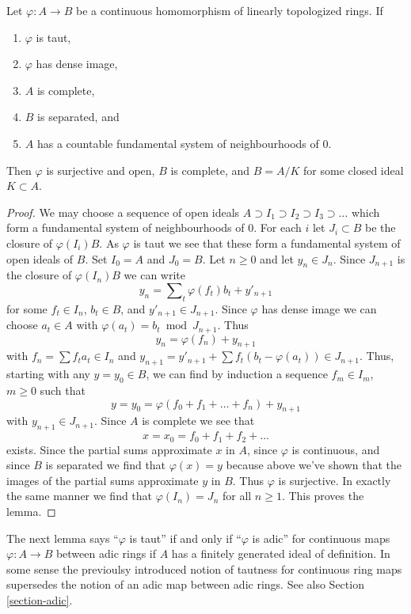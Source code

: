 \begin{lemma}
\label{lemma-dense-image-surjective}
Let $\varphi : A \to B$ be a continuous homomorphism of
linearly topologized rings. If
\begin{enumerate}
\item $\varphi$ is taut,
\item $\varphi$ has dense image,
\item $A$ is complete,
\item $B$ is separated, and
\item $A$ has a countable fundamental system of neighbourhoods of $0$.
\end{enumerate}
Then $\varphi$ is surjective and open, $B$ is complete, and $B = A/K$ for
some closed ideal $K \subset A$.
\end{lemma}

\begin{proof}
We may choose a sequence of open ideals
$A \supset I_1 \supset I_2 \supset I_3 \supset \ldots$
which form a fundamental system of neighbourhoods of $0$.
For each $i$ let $J_i \subset B$ be the closure of $\varphi(I_i)B$.
As $\varphi$ is taut we see that these form a fundamental system
of open ideals of $B$. Set $I_0 = A$ and $J_0 = B$.
Let $n \geq 0$ and let $y_n \in J_n$. Since $J_{n + 1}$ is the
closure of $\varphi(I_n)B$ we can write
$$
y_n = \sum\nolimits_t \varphi(f_t)b_t + y'_{n + 1}
$$
for some $f_t \in I_n$, $b_t \in B$, and $y'_{n + 1} \in J_{n + 1}$.
Since $\varphi$ has dense image we can choose $a_t \in A$ with
$\varphi(a_t) = b_t \bmod J_{n + 1}$. Thus
$$
y_n = \varphi(f_n) + y_{n + 1}
$$
with $f_n = \sum f_ta_t \in I_n$ and
$y_{n + 1} = y'_{n + 1} + \sum f_t(b_t - \varphi(a_t)) \in J_{n + 1}$.
Thus, starting with any $y = y_0 \in B$, we can find by induction
a sequence $f_m \in I_m$, $m \geq 0$ such that 
$$
y = y_0 = \varphi(f_0 + f_1 + \ldots + f_n) + y_{n + 1}
$$
with $y_{n + 1} \in J_{n + 1}$. Since $A$ is complete we see that
$$
x = x_0 = f_0 + f_1 + f_2 + \ldots
$$
exists. Since the partial sums approximate $x$ in $A$, since $\varphi$
is continuous, and since $B$ is separated we find that $\varphi(x) = y$
because above we've shown that the images of the partial sums approximate $y$
in $B$. Thus $\varphi$ is surjective. In exactly the same manner we
find that $\varphi(I_n) = J_n$ for all $n \geq 1$. This proves the lemma.
\end{proof}

\noindent
The next lemma says ``$\varphi$ is taut'' if and only if ``$\varphi$ is adic''
for continuous maps $\varphi : A \to B$ between adic rings if $A$
has a finitely generated ideal of definition. In some sense the previoulsy
introduced notion of tautness for continuous ring maps supersedes the
notion of an adic map between adic rings. See also Section \ref{section-adic}.

